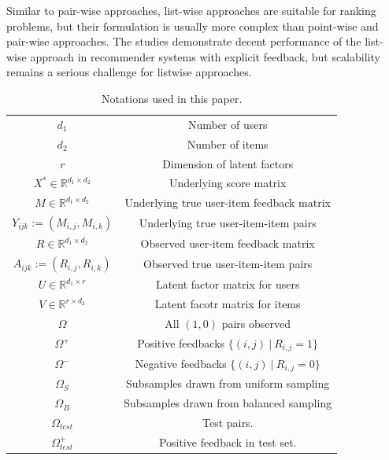 \documentclass[conference]{IEEEtran}
\numberwithin{equation}{section}
\newcommand{\R}{\mathbb{R}}
\newtheorem{sampling strategy}{Sampling Strategy}
\begin{document}
Similar to pair-wise approaches, list-wise approaches are suitable for ranking problems, but their formulation is usually more complex than point-wise and pair-wise approaches. The studies  \cite{listwise,listcollaborativefiltering} demonstrate
decent performance of the list-wise approach in recommender systems with explicit feedback, but  scalability remains a serious challenge for listwise approaches.  
\begin{table}[t!]
    \centering
    \begin{tabular}{|c|c|} \hline
        $d_1$ & Number of users \\
        $d_2$ & Number of items \\
        $r$ & Dimension of latent factors \\
        $X^* \in \R^{d_1 \times d_2}$ & Underlying score matrix \\
        $M \in \R^{d_1 \times d_2} $ & Underlying true user-item feedback matrix \\
        $Y_{ijk} := (M_{i,j}, M_{i,k})$ & Underlying true user-item-item pairs \\ 
        $R \in \R^{d_1 \times d_2}$ & Observed user-item feedback matrix \\
        $A_{ijk} := (R_{i,j}, R_{i,k})$ & Observed true user-item-item pairs \\ 
        $U \in \R^{d_1 \times r}$ & Latent factor matrix for users \\
        $V \in \R^{r \times d_2}$ & Latent facotr matrix for items \\
        $\Omega$ & All $(1,0)$ pairs observed \\
        $\Omega^+$ & Positive feedbacks $\{(i,j) ~|~ R_{i,j} = 1\}$ \\
        $\Omega^-$ & Negative feedbacks $\{(i,j) ~|~ R_{i,j} = 0\}$ \\
        $\Omega_S$ & Subsamples drawn from uniform sampling \\ 
        $\Omega_B$ & Subsamples drawn from balanced sampling \\
        $\Omega_{test}$ & Test pairs. \\
        $\Omega_{test}^+$ & Positive feedback in test set. \\
        \hline
    \end{tabular}
    \caption{Notations used in this paper. }
    \label{tab:notations}
\end{table}
\end{document}
